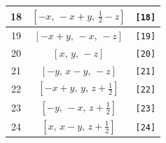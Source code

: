 \documentclass[fleqn,8pt]{jsarticle}
\begin{document}
\begin{longtable}{ccc}
18 & $\left[ - x,\, - x + y,\, \frac{1}{2} - z \right]$ & {\tt [18]} \\ \hline
19 & $\left[ - x + y,\, - x,\, - z \right]$ & {\tt [19]} \\ \hline
20 & $\left[ x,\, y,\, - z \right]$ & {\tt [20]} \\ \hline
21 & $\left[ - y,\, x - y,\, - z \right]$ & {\tt [21]} \\ \hline
22 & $\left[ - x + y,\, y,\, z + \frac{1}{2} \right]$ & {\tt [22]} \\ \hline
23 & $\left[ - y,\, - x,\, z + \frac{1}{2} \right]$ & {\tt [23]} \\ \hline
24 & $\left[ x,\, x - y,\, z + \frac{1}{2} \right]$ & {\tt [24]} \\
\end{longtable}
\end{document}
